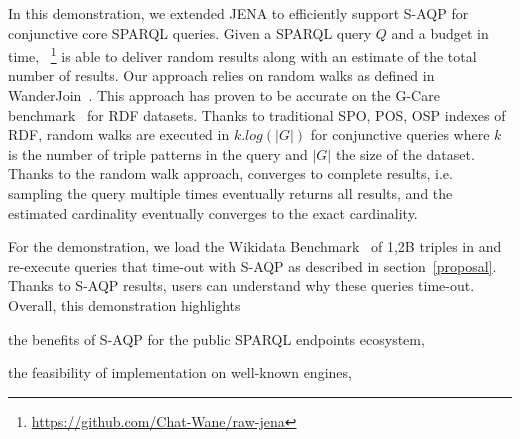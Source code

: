   In this demonstration, we extended JENA to efficiently support
  S-AQP for conjunctive core
  SPARQL queries. Given a SPARQL query $Q$ and a budget in time,
  \NAME~\footnote{\url{https://github.com/Chat-Wane/raw-jena}} is able
  to deliver random results along with an estimate of the
  total number of results. Our approach relies on random
 walks as defined in WanderJoin~\cite{li2019wanderjoin}. This approach
 has proven to be accurate on the G-Care
 benchmark~\cite{DBLP:conf/sigmod/ParkKBKHH20} for RDF datasets. Thanks
 to traditional SPO, POS, OSP indexes of RDF, random
 walks are executed in $k.log(|G|)$ for conjunctive queries where
 $k$ is the number of triple patterns in the query and $|G|$ the size
 of the dataset. Thanks to the random walk approach, \NAME converges
 to complete results, i.e. sampling the query multiple times eventually
 returns all results, and the estimated cardinality eventually converges
 to the exact cardinality.

 \noindent For the demonstration, we load the Wikidata
 Benchmark~\cite{angles2022wdbench} of 1,2B triples in \NAME and
 re-execute queries that time-out with S-AQP as described in
 section~\ref{proposal}. Thanks to S-AQP results, users can understand
 why these queries time-out. Overall, this demonstration highlights
\begin{inparaenum}[(i)]
\item the benefits of S-AQP for the public SPARQL endpoints ecosystem,
\item the feasibility of implementation on well-known engines,
\end{inparaenum}



